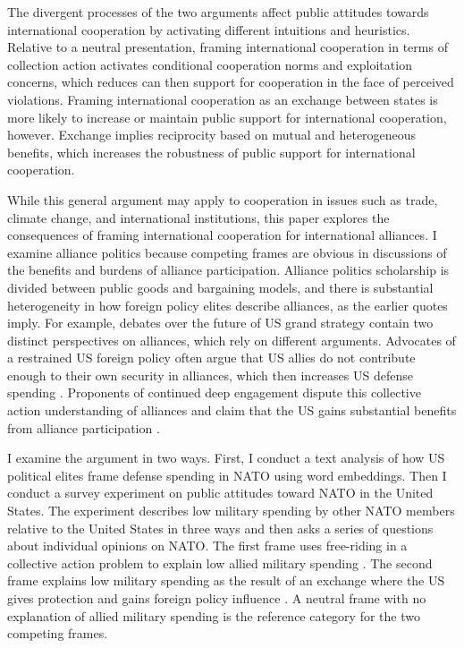 \documentclass[12pt]{article}
\begin{document}
The divergent processes of the two arguments affect public attitudes towards international cooperation by activating different intuitions and heuristics.   
Relative to a neutral presentation, framing international cooperation in terms of collection action activates conditional cooperation norms and exploitation concerns, which reduces can then support for cooperation in the face of perceived violations. 
Framing international cooperation as an exchange between states is more likely to increase or maintain public support for international cooperation, however. 
Exchange implies reciprocity based on mutual and heterogeneous benefits, which increases the robustness of public support for international cooperation. 


While this general argument may apply to cooperation in issues such as trade, climate change, and international institutions, this paper explores the consequences of framing international cooperation for international alliances. 
I examine alliance politics because competing frames are obvious in discussions of the benefits and burdens of alliance participation. 
Alliance politics scholarship is divided between public goods and bargaining models, and there is substantial heterogeneity in how foreign policy elites describe alliances, as the earlier quotes imply. 
For example, debates over the future of US grand strategy contain two distinct perspectives on alliances, which rely on different arguments. 
Advocates of a restrained US foreign policy often argue that US allies do not contribute enough to their own security in alliances, which then increases US defense spending \citep{Preble2009, Posen2014}.
Proponents of continued deep engagement dispute this collective action understanding of alliances and claim that the US gains substantial benefits from alliance participation \citep{BrooksWohlforth2008, BrandsFeaver2017}. 


I examine the argument in two ways.
First, I conduct a text analysis of how US political elites frame defense spending in NATO using word embeddings.  
Then I conduct a survey experiment on public attitudes toward NATO in the United States.
The experiment describes low military spending by other NATO members relative to the United States in three ways and then asks a series of questions about individual opinions on NATO.
The first frame uses free-riding in a collective action problem to explain low allied military spending \citep{OlsonZeckhauser1966}.
The second frame explains low military spending as the result of an exchange where the US gives protection and gains foreign policy influence \citep{Morrow1991}.
A neutral frame with no explanation of allied military spending is the reference category for the two competing frames.
\end{document}
